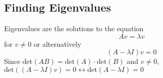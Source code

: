 \documentclass[../main.tex]{subfiles}
\begin{document}
\subsection{Finding Eigenvalues}
Eigenvalues are the solutions to the equation
\begin{equation*}
Av=\lambda v
\end{equation*}
for $v \ne 0$ or alternatively
\begin{equation*}
(A-\lambda I)v = 0
\end{equation*}
Since $\text{det}(AB) = \text{det}(A)\cdot\text{det}(B)$ and $v \ne 0$, $\text{det}((A-\lambda I)v) = 0 \leftrightarrow \text{det}(A-\lambda I) = 0$
\end{document}
